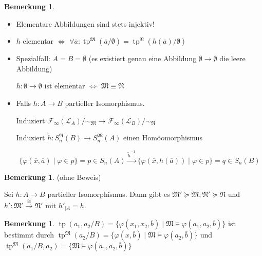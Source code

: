 \documentclass[12pt,parskip=full]{scrartcl}
\theoremstyle{definition}
\newtheorem{remark}[theorem]{Bemerkung}
\begin{document}
	\begin{remark}
		\begin{itemize}
			\item Elementare Abbildungen sind stets injektiv!
			\item $h$ elementar $\Leftrightarrow$ $\forall \overline{a}: \operatorname{tp}^\mathfrak{M}(\overline{a} / \emptyset) = \operatorname{tp}^\mathfrak{N}(h(\overline{a}) / \emptyset)$
			\item Spezialfall: $A = B = \emptyset$ (es existiert genau eine Abbildung $\emptyset \to \emptyset$ die leere Abbildung)
			
			$h: \emptyset \to \emptyset$ ist elementar $\Leftrightarrow$ $\mathfrak{M} \equiv \mathfrak{N}$
			\item Falls $h: A \to B$ partieller Isomorphismus.
			
			Induziert $\mathcal{F}_\infty(\mathcal{L}_A) / \sim_\mathfrak{M} \to \mathcal{F}_\infty(\mathcal{L}_B) / \sim_\mathfrak{N}$
			
			Induziert $\tilde{h}: S_n^\mathfrak{N}(B) \to S_n^\mathfrak{M}(A)$ einen Homöomorphismus
			
			\begin{equation*}
				\{ \varphi(\overline{x}, \overline{a}) \mid \varphi \in p \} = p \in S_n(A) \overset{\tilde{h}^{-1}}{\longrightarrow} \{ \varphi(\overline{x}, h(\overline{a})) \mid \varphi \in p \} = q \in S_n(B)
			\end{equation*}
		\end{itemize}
	\end{remark}

	\begin{remark}(ohne Beweis)
		
		Sei $h: A \to B$ partieller Isomorphismus. Dann gibt es $\mathfrak{M}' \succcurlyeq \mathfrak{M}, \mathfrak{N}' \succcurlyeq \mathfrak{N}$ und $h': \mathfrak{M}' \overset{\cong}{\to} \mathfrak{N}'$ mit $h'_{\mid A} = h$.
	\end{remark}

	\begin{remark}
		$\operatorname{tp}(a_1, a_2 / B) = \{ \varphi(x_1, x_2, \overline{b}) \mid \mathfrak{M} \models \varphi(a_1, a_2, \overline{b}) \}$ ist bestimmt durch $\operatorname{tp}^\mathfrak{M}(a_2 /B) = \{ \varphi(x, \overline{b}) \mid \mathfrak{M} \models \varphi(a_2, \overline{b}) \}$ und $\operatorname{tp}^\mathfrak{M}(a_1 / B, a_2) = \{ \mathfrak{M} \models \varphi(a_1, a_2, \overline{b}) \}$
	\end{remark}
\end{document}
